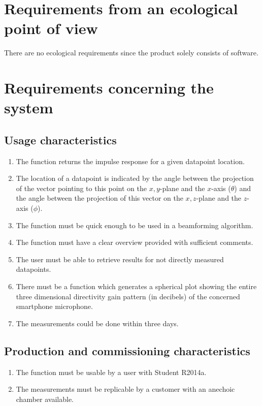 \section{Requirements from an ecological point of view}
There are no ecological requirements since the product solely consists of software. 

\section{Requirements concerning the system}

\subsection{Usage characteristics}
\begin{enumerate}
\item The function returns the impulse response for a given datapoint location.
\item The location of a datapoint is indicated by the angle between the projection of the vector pointing to this point on the $x,y$-plane and the $x$-axis ($\theta$) and the angle between the projection of this vector on the $x,z$-plane and the $z$-axis ($\phi$).
\item The function must be quick enough to be used in a beamforming algorithm. 
\item The function must have a clear overview provided with sufficient comments. 
\item The user must be able to retrieve results for not directly measured datapoints.
\item There must be a function which generates a spherical plot showing the entire three dimensional directivity gain pattern (in decibels) of the concerned smartphone microphone. 
\item The measurements could be done within three days. 
\end{enumerate}

\subsection{Production and commissioning characteristics}
\begin{enumerate}
\item The function must be usable by a user with {\matlab} Student R2014a.
\item The measurements must be replicable by a customer with an anechoic chamber available. 
\end{enumerate}


